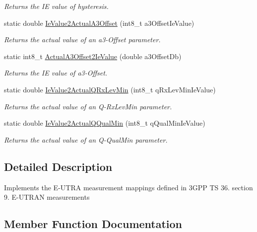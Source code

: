 \begin{DoxyCompactItemize}
\begin{DoxyCompactList}\small\item\em Returns the IE value of hysteresis. \end{DoxyCompactList}\item 
static double \hyperlink{classns3_1_1EutranMeasurementMapping_af804c5582b55b0e7f644efe8da1f21ab}{Ie\+Value2\+Actual\+A3\+Offset} (int8\+\_\+t a3\+Offset\+Ie\+Value)
\begin{DoxyCompactList}\small\item\em Returns the actual value of an a3-\/\+Offset parameter. \end{DoxyCompactList}\item 
static int8\+\_\+t \hyperlink{classns3_1_1EutranMeasurementMapping_a25d23192625781955aa23c2bdc5ed58d}{Actual\+A3\+Offset2\+Ie\+Value} (double a3\+Offset\+Db)
\begin{DoxyCompactList}\small\item\em Returns the IE value of a3-\/\+Offset. \end{DoxyCompactList}\item 
static double \hyperlink{classns3_1_1EutranMeasurementMapping_aa0e6f0265dccf1b6998658066ccb4ee0}{Ie\+Value2\+Actual\+Q\+Rx\+Lev\+Min} (int8\+\_\+t q\+Rx\+Lev\+Min\+Ie\+Value)
\begin{DoxyCompactList}\small\item\em Returns the actual value of an Q-\/\+Rx\+Lev\+Min parameter. \end{DoxyCompactList}\item 
static double \hyperlink{classns3_1_1EutranMeasurementMapping_a94ecee402bc71f2454f5993a5d9535f2}{Ie\+Value2\+Actual\+Q\+Qual\+Min} (int8\+\_\+t q\+Qual\+Min\+Ie\+Value)
\begin{DoxyCompactList}\small\item\em Returns the actual value of an Q-\/\+Qual\+Min parameter. \end{DoxyCompactList}\end{DoxyCompactItemize}


\subsection{Detailed Description}
Implements the E-\/\+U\+T\+RA measurement mappings defined in 3\+G\+PP TS 36. section 9. E-\/\+U\+T\+R\+AN measurements 

\subsection{Member Function Documentation}

